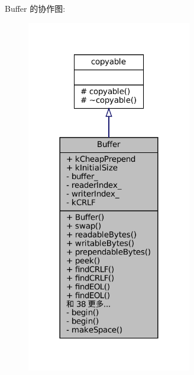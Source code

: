 Buffer 的协作图\+:
\nopagebreak
\begin{figure}[H]
\begin{center}
\leavevmode
\includegraphics[width=204pt]{classmuduo_1_1net_1_1Buffer__coll__graph}
\end{center}
\end{figure}
